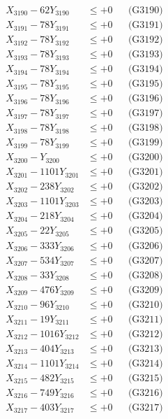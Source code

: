 \documentclass[a4paper,10pt]{article}
\begin{document}
{\begin{align}
X_{3190} - 62Y_{3190} &\leq +0 && \text{(G3190)} \\
\allowbreak
X_{3191} - 78Y_{3191} &\leq +0 && \text{(G3191)} \\
X_{3192} - 78Y_{3192} &\leq +0 && \text{(G3192)} \\
X_{3193} - 78Y_{3193} &\leq +0 && \text{(G3193)} \\
X_{3194} - 78Y_{3194} &\leq +0 && \text{(G3194)} \\
X_{3195} - 78Y_{3195} &\leq +0 && \text{(G3195)} \\
X_{3196} - 78Y_{3196} &\leq +0 && \text{(G3196)} \\
X_{3197} - 78Y_{3197} &\leq +0 && \text{(G3197)} \\
X_{3198} - 78Y_{3198} &\leq +0 && \text{(G3198)} \\
X_{3199} - 78Y_{3199} &\leq +0 && \text{(G3199)} \\
X_{3200} - Y_{3200} &\leq +0 && \text{(G3200)} \\
\allowbreak
X_{3201} - 1101Y_{3201} &\leq +0 && \text{(G3201)} \\
X_{3202} - 238Y_{3202} &\leq +0 && \text{(G3202)} \\
X_{3203} - 1101Y_{3203} &\leq +0 && \text{(G3203)} \\
X_{3204} - 218Y_{3204} &\leq +0 && \text{(G3204)} \\
X_{3205} - 22Y_{3205} &\leq +0 && \text{(G3205)} \\
X_{3206} - 333Y_{3206} &\leq +0 && \text{(G3206)} \\
X_{3207} - 534Y_{3207} &\leq +0 && \text{(G3207)} \\
X_{3208} - 33Y_{3208} &\leq +0 && \text{(G3208)} \\
X_{3209} - 476Y_{3209} &\leq +0 && \text{(G3209)} \\
X_{3210} - 96Y_{3210} &\leq +0 && \text{(G3210)} \\
\allowbreak
X_{3211} - 19Y_{3211} &\leq +0 && \text{(G3211)} \\
X_{3212} - 1016Y_{3212} &\leq +0 && \text{(G3212)} \\
X_{3213} - 404Y_{3213} &\leq +0 && \text{(G3213)} \\
X_{3214} - 1101Y_{3214} &\leq +0 && \text{(G3214)} \\
X_{3215} - 482Y_{3215} &\leq +0 && \text{(G3215)} \\
X_{3216} - 749Y_{3216} &\leq +0 && \text{(G3216)} \\
X_{3217} - 403Y_{3217} &\leq +0 && \text{(G3217)} \\

\end{align}}
\end{document}
